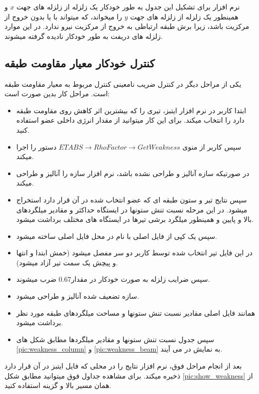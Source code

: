 نرم افزار برای تشکیل این جدول به طور خودکار یک زلزله  از زلزله های جهت 
$x$ و 
همینطور یک زلزله  از زلزله های جهت $y$
را میخواند، که میتواند با یا بدون خروج از مرکزیت باشد، زیرا برش طبقه ارتباطی به خروج از مرکزیت نیرو ندارد. در این موارد زلزله های دریفت به طور خودکار نادیده گرفته میشوند.


\subsection{کنترل خودکار معیار مقاومت طبقه}
یکی از مراحل دیگر در کنترل ضریب نامعینی کنترل مربوط به معیار مقاومت طبقه است. مراحل کار بدین صورت است:

\begin{itemize}
    \item ابتدا کاربر در نرم افزار ایتبز، تیری را که بیشترین اثر کاهش روی مقاومت طبقه دارد را انتخاب میکند. برای این کار میتوانید از مقدار انرژی داخلی عضو استفاده کنید.
    \item سپس کاربر از منوی $ETABS \rightarrow Rho Factor \rightarrow Get Weakness$ دستور را اجرا میکند.
    \item در صورتیکه سازه آنالیز و طراحی نشده باشد، نرم افزار سازه را آنالیز و طراحی میکند.
    \item سپس نتایج تیر و ستون طبقه ای که عضو انتخاب شده در آن قرار دارد استخراج میشود. در این مرحله نسبت تنش ستونها در ایستگاه حداکثر و مقادیر میلگردهای بالا و پایین و همینطور میلگرد برشی تیرها در ایستگاه های مختلف برداشت میشود.
    \item سپس یک کپی از فایل اصلی با نام  در محل فایل اصلی ساخته میشود.
    \item در این فایل تیر انتخاب شده توسط کاربر دو سر مفصل میشود (خمش ابتدا و انتها و پیچش یک سمت تیر آزاد میشود).
    \item سپس ضرایب زلزله به صورت خودکار در مقدار$0.67$ ضرب میشوند.
    \item سازه تضعیف شده آنالیز و طراحی میشود.
    \item همانند فایل اصلی مقادیر نسبت تنش ستونها و مساحت میلگردهای طبقه مورد نظر برداشت میشود.
    \item سپس جدول نسبت تنش ستونها و مقادیر میلگردها مطابق شکل های \ref{pic:weakness_column} و \ref{pic:weakness_beam} به نمایش در می آیند.
\end{itemize}

بعد از انجام مراحل فوق، نرم افزار نتایج را در محلی که فایل ایتبز در آن قرار دارد ذخیره میکند. برای مشاهده جداول فوق میتوانید مطابق شکل
\ref{pic:show_weakness}
از همان مسیر بالا و گزینه 
استفاده کنید.

